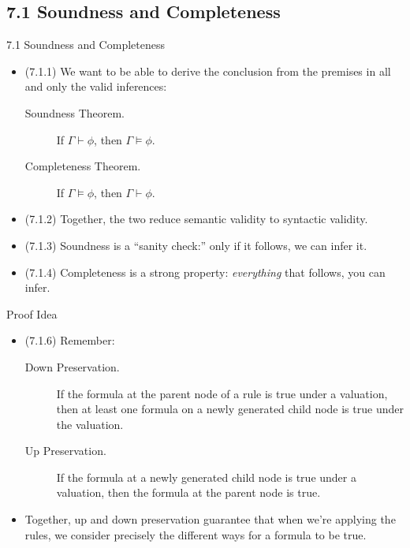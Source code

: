 \subsection{7.1 Soundness and Completeness}

\begin{frame}{7.1 Soundness and Completeness}

	\begin{itemize}
		
		\item (7.1.1) We want to be able to  derive the conclusion from the premises in all and only the valid inferences:
		
				\begin{description}
		
			\item[Soundness Theorem.] If $\Gamma\vdash\phi$, then $\Gamma\vDash\phi$.
			
			\item[Completeness Theorem.] If $\Gamma\vDash\phi$, then $\Gamma\vdash\phi$.
		
		\end{description}
	
		\item (7.1.2) Together, the two reduce semantic validity to syntactic validity.
	
		\item (7.1.3) Soundness is a ``sanity check:'' only if it follows, we can infer it.
		
		\item (7.1.4) Completeness is a strong property: \emph{everything} that follows, you can infer.
		
	\end{itemize}

\end{frame}

\begin{frame}{Proof Idea}

	\begin{itemize}
	
		\item (7.1.6) Remember:
		
		\begin{description}
			
				\item[Down Preservation.] If the formula at the parent node of a rule is true under a valuation, then at least one formula on a newly generated child node is true under the valuation.
				
				\item[Up Preservation.] If the formula at a newly generated child node is true under a valuation, then the formula at the parent node is true.
				
		\end{description}
		
		\item Together, up and down preservation guarantee that when we're applying the rules, we consider precisely the different ways for a formula to be true.
	
	\end{itemize}


\end{frame}

